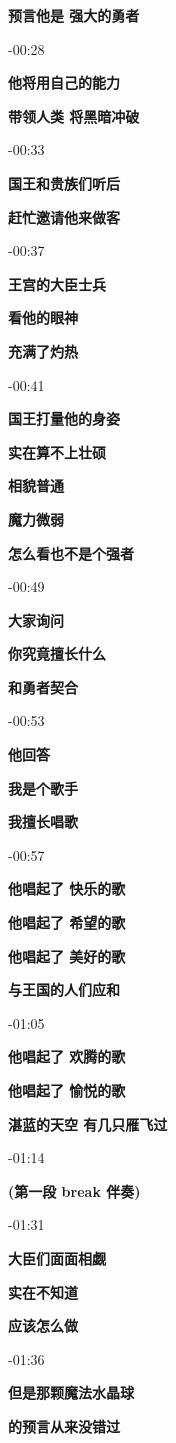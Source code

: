 \documentclass[a4paper]{article}
\begin{document}
\textbf{预言他是 强大的勇者}

-00:28

\textbf{他将用自己的能力}

\textbf{带领人类 将黑暗冲破}

-00:33

\textbf{国王和贵族们听后}

\textbf{赶忙邀请他来做客}

-00:37

\textbf{王宫的大臣士兵}

\textbf{看他的眼神}

\textbf{充满了灼热}

-00:41

\textbf{国王打量他的身姿}

\textbf{实在算不上壮硕}

\textbf{相貌普通}

\textbf{魔力微弱}

\textbf{怎么看也不是个强者}

-00:49

\textbf{大家询问}

\textbf{你究竟擅长什么}

\textbf{和勇者契合}

-00:53

\textbf{他回答}

\textbf{我是个歌手}

\textbf{我擅长唱歌}

-00:57

\textbf{他唱起了 快乐的歌}

\textbf{他唱起了 希望的歌}

\textbf{他唱起了 美好的歌}

\textbf{与王国的人们应和}

-01:05

\textbf{他唱起了 欢腾的歌}

\textbf{他唱起了 愉悦的歌}

\textbf{湛蓝的天空 有几只雁飞过}

-01:14

\textbf{(第一段 break 伴奏)}

-01:31

\textbf{大臣们面面相觑}

\textbf{实在不知道}

\textbf{应该怎么做}

-01:36

\textbf{但是那颗魔法水晶球}

\textbf{的预言从来没错过}
\end{document}
